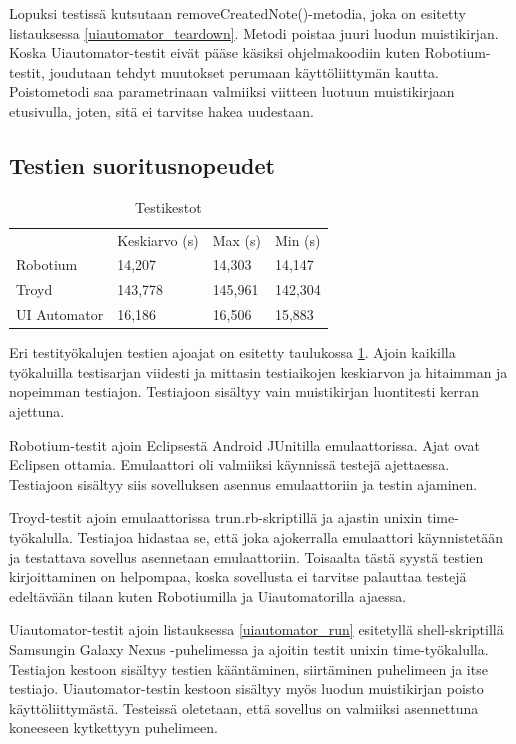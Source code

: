 Lopuksi testissä kutsutaan removeCreatedNote()-metodia, joka on esitetty listauksessa \ref{uiautomator_teardown}. Metodi poistaa juuri luodun muistikirjan. Koska Uiautomator-testit eivät pääse käsiksi ohjelmakoodiin kuten Robotium-testit, joudutaan tehdyt muutokset perumaan käyttöliittymän kautta. Poistometodi saa parametrinaan valmiiksi viitteen luotuun muistikirjaan etusivulla, joten, sitä ei tarvitse hakea uudestaan.

\subsection{Testien suoritusnopeudet}

\begin{table}[h]
\centering
\begin{tabular}{ l l l l }
   & Keskiarvo (s) & Max (s) & Min (s) \\
  Robotium & 14,207 & 14,303 & 14,147 \\
  Troyd & 143,778 & 145,961 & 142,304 \\
  UI Automator & 16,186 & 16,506 & 15,883 \\
\end{tabular}
\caption{Testikestot}
\label{uitest_timing}
\end{table}

Eri testityökalujen testien ajoajat on esitetty taulukossa \ref{uitest_timing}. Ajoin kaikilla työkaluilla testisarjan viidesti ja mittasin testiaikojen keskiarvon ja hitaimman ja nopeimman testiajon. Testiajoon sisältyy vain muistikirjan luontitesti kerran ajettuna. 

Robotium-testit ajoin Eclipsestä Android JUnitilla emulaattorissa. Ajat ovat Eclipsen ottamia. Emulaattori oli valmiiksi käynnissä testejä ajettaessa. Testiajoon sisältyy siis sovelluksen asennus emulaattoriin ja testin ajaminen.

Troyd-testit ajoin emulaattorissa trun.rb-skriptillä ja ajastin unixin time-työkalulla. Testiajoa hidastaa se, että joka ajokerralla emulaattori käynnistetään ja testattava sovellus asennetaan emulaattoriin. Toisaalta tästä syystä testien kirjoittaminen on helpompaa, koska sovellusta ei tarvitse palauttaa testejä edeltävään tilaan kuten Robotiumilla ja Uiautomatorilla ajaessa.

Uiautomator-testit ajoin listauksessa \ref{uiautomator_run} esitetyllä shell-skriptillä Samsungin Galaxy Nexus -puhelimessa ja ajoitin testit unixin time-työkalulla. Testiajon kestoon sisältyy testien kääntäminen, siirtäminen puhelimeen ja itse testiajo. Uiautomator-testin kestoon sisältyy myös luodun muistikirjan poisto käyttöliittymästä. Testeissä oletetaan, että sovellus on valmiiksi asennettuna koneeseen kytkettyyn puhelimeen.

